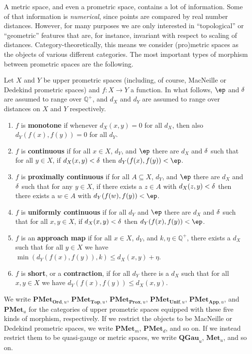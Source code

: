 \documentclass{article}
\def\Qp{\mathbb{Q}^+}
\def\PMet{\mathbf{PMet}}
\def\QGau{\mathbf{QGau}}
\def\Met{\mathbf{Met}}
\def\PMetu{\mathbf{PMet}_u}
\def\PMetTopu{\mathbf{PMet}_{\mathbf{Top},u}}
\def\PMetUnifu{\mathbf{PMet}_{\mathbf{Unif},u}}
\def\PMetProxu{\mathbf{PMet}_{\mathbf{Prox},u}}
\def\PMetAppu{\mathbf{PMet}_{\mathbf{App},u}}
\def\PMetOrdu{\mathbf{PMet}_{\mathbf{Ord},u}}
\begin{document}
A metric space, and even a prometric space, contains a lot of information.
Some of that information is \emph{numerical}, since points are compared by real number distances.
However, for many purposes we are only interested in ``topological'' or ``geometric'' features that are, for instance, invariant with respect to scaling of distances.
Category-theoretically, this means we consider (pro)metric spaces as the objects of various different categories.
The most important types of morphism between prometric spaces are the following.

\begin{defn}
  Let $X$ and $Y$ be upper prometric spaces (including, of course, MacNeille or Dedekind prometric spaces) and $f:X\to Y$ a function.
  In what follows, $\ep$ and $\delta$ are assumed to range over $\Qp$, and $d_X$ and $d_Y$ are assumed to range over distances on $X$ and $Y$ respectively.
  \begin{enumerate}
  \item $f$ is \textbf{monotone} if whenever $d_X(x,y)=0$ for all $d_X$, then also $d_Y(f(x),f(y))=0$ for all $d_Y$.
  \item $f$ is \textbf{continuous} if for all $x\in X$, $d_Y$, and $\ep$ there are $d_X$ and $\delta$ such that for all $y\in X$, if $d_X(x,y)<\delta$ then $d_Y(f(x),f(y))<\ep$.
  \item $f$ is \textbf{proximally continuous} if for all $A\subseteq X$, $d_Y$, and $\ep$ there are $d_X$ and $\delta$ such that for any $y\in X$, if there exists a $z\in A$ with $d_X(z,y)<\delta$ then there exists a $w\in A$ with $d_Y(f(w),f(y))<\ep$.
  \item $f$ is \textbf{uniformly continuous} if for all $d_Y$ and $\ep$ there are $d_X$ and $\delta$ such that for all $x,y\in X$, if $d_X(x,y)<\delta$ then $d_Y(f(x),f(y))<\ep$.
  \item $f$ is an \textbf{approach map} if for all $x\in X$, $d_Y$, and $k,\eta\in \Qp$, there exists a $d_X$ such that for all $y\in X$ we have $\min(d_Y(f(x),f(y)),k) \le d_X(x,y) +\eta$.
  \item $f$ is \textbf{short}, or a \textbf{contraction}, if for all $d_Y$ there is a $d_X$ such that for all $x,y\in X$ we have $d_Y(f(x),f(y)) \le d_X(x,y)$.
  \end{enumerate}
  We write $\PMetOrdu$, $\PMetTopu$, $\PMetProxu$, $\PMetUnifu$, $\PMetAppu$, and $\PMetu$ for the categories of upper prometric spaces equipped with these five kinds of morphism, respectively.
  If we restrict the objects to be MacNeille or Dedekind prometric spaces, we write $\PMet_m$, $\PMet_d$, and so on.
  If we instead restrict them to be quasi-gauge or metric spaces, we write $\QGau_u$, $\Met_u$, and so on.
\end{defn}
\end{document}
